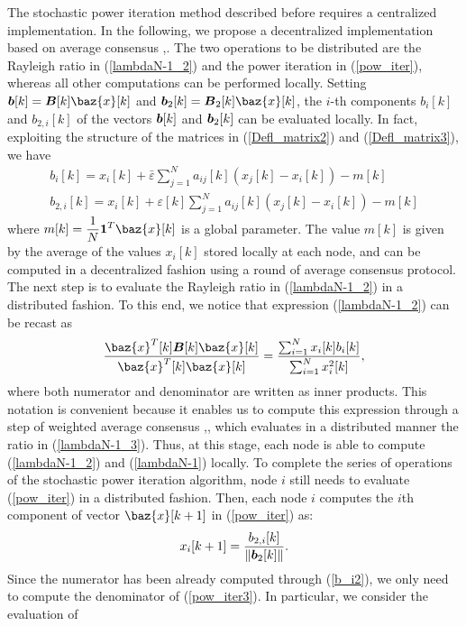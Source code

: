 \documentclass[10pt,twocolumn]{IEEEtran}
\def\bB{\mbox{\boldmath $B$}}
\def\bb{\mbox{\boldmath $b$}}
\def\bx{\baz{x}}
\begin{document}
 The stochastic power iteration method described before requires a centralized implementation. In the following, we propose a decentralized implementation based on average consensus \cite{Olfati1},\cite{Barb-Scut}. The two operations to be distributed are the Rayleigh ratio in (\ref{lambdaN-1_2}) and the power iteration in (\ref{pow_iter}), whereas all other computations can be performed locally. 
Setting $\bb[k]=\bB[k]\bx[k]$ and $\bb_2[k]=\bB_2[k]\bx[k]$, the $i$-th components $b_i[k]$ and $b_{2,i}[k]$ of the vectors $\bb[k]$ and $\bb_2[k]$ can be evaluated locally. In fact, exploiting the structure of the matrices in (\ref{Defl_matrix2}) and (\ref{Defl_matrix3}), we have
\begin{eqnarray}
    b_i[k]=x_i[k]+\bar{\varepsilon}\sum_{j=1}^Na_{ij}[k](x_j[k]-x_i[k])-m[k]\label{b_i}\\
    b_{2,i}[k]=x_i[k]+\varepsilon[k]\sum_{j=1}^Na_{ij}[k](x_j[k]-x_i[k])-m[k]\label{b_i2}
\end{eqnarray}
where $\displaystyle m[k]=\frac{1}{N}\mathbf{1}^T\bx[k]$ is a global parameter.
The value $m[k]$ is given by the average of the values $x_i[k]$ stored locally at each node, and can be computed in a decentralized fashion using a round of average consensus protocol. The next step is to evaluate the Rayleigh ratio in (\ref{lambdaN-1_2}) in a distributed fashion. To this end, we notice that expression (\ref{lambdaN-1_2}) can be recast as
\begin{eqnarray}\label{lambdaN-1_3}
\displaystyle\frac{\bx^T[k]\bB[k]\bx[k]}{\bx^T[k]\bx[k]}
=\frac{\sum_{i=1}^N x_i[k]b_i[k]}{\sum_{i=1}^N x^2_i[k]},
\end{eqnarray}
where both numerator and denominator are written as inner products. This notation is convenient because it enables us to compute this expression through a step of weighted average consensus \cite{Olfati1},\cite{Barb-Scut}, which evaluates in a distributed manner the ratio in (\ref{lambdaN-1_3}). Thus, at this stage, each node is able to compute (\ref{lambdaN-1_2}) and (\ref{lambdaN-1}) locally.
To complete the series of operations of the stochastic power iteration algorithm, node $i$ still needs  to evaluate (\ref{pow_iter}) in a distributed fashion. Then, each node $i$ computes the $i$th component of vector $\bx[k+1]$ in (\ref{pow_iter}) as:
\begin{equation}\label{pow_iter3}
     x_i[k+1]=\frac{b_{2,i}[k]}{\|\bb_2[k]\|}.
\end{equation}
Since the numerator has been already computed through (\ref{b_i2}), we only need to compute the denominator of (\ref{pow_iter3}). In particular, we consider the evaluation of
\end{document}
